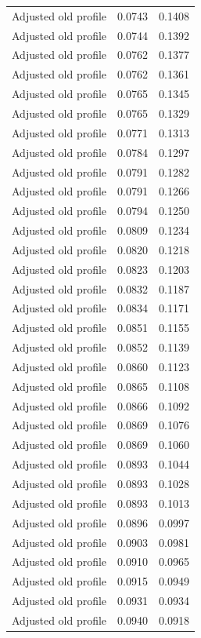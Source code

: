 \begin{table}[htbp]
\begin{tabular}{lll}
Adjusted old profile & 0.0743 & 0.1408 \\
Adjusted old profile & 0.0744 & 0.1392 \\
Adjusted old profile & 0.0762 & 0.1377 \\
Adjusted old profile & 0.0762 & 0.1361 \\
Adjusted old profile & 0.0765 & 0.1345 \\
Adjusted old profile & 0.0765 & 0.1329 \\
Adjusted old profile & 0.0771 & 0.1313 \\
Adjusted old profile & 0.0784 & 0.1297 \\
Adjusted old profile & 0.0791 & 0.1282 \\
Adjusted old profile & 0.0791 & 0.1266 \\
Adjusted old profile & 0.0794 & 0.1250 \\
Adjusted old profile & 0.0809 & 0.1234 \\
Adjusted old profile & 0.0820 & 0.1218 \\
Adjusted old profile & 0.0823 & 0.1203 \\
Adjusted old profile & 0.0832 & 0.1187 \\
Adjusted old profile & 0.0834 & 0.1171 \\
Adjusted old profile & 0.0851 & 0.1155 \\
Adjusted old profile & 0.0852 & 0.1139 \\
Adjusted old profile & 0.0860 & 0.1123 \\
Adjusted old profile & 0.0865 & 0.1108 \\
Adjusted old profile & 0.0866 & 0.1092 \\
Adjusted old profile & 0.0869 & 0.1076 \\
Adjusted old profile & 0.0869 & 0.1060 \\
Adjusted old profile & 0.0893 & 0.1044 \\
Adjusted old profile & 0.0893 & 0.1028 \\
Adjusted old profile & 0.0893 & 0.1013 \\
Adjusted old profile & 0.0896 & 0.0997 \\
Adjusted old profile & 0.0903 & 0.0981 \\
Adjusted old profile & 0.0910 & 0.0965 \\
Adjusted old profile & 0.0915 & 0.0949 \\
Adjusted old profile & 0.0931 & 0.0934 \\
Adjusted old profile & 0.0940 & 0.0918 \\

\end{tabular}
\end{table}
